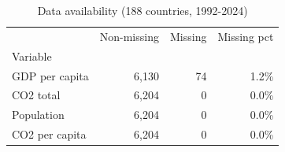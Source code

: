 \begin{table}[h]
\centering
\caption{Data availability (188 countries, 1992-2024)}
\begin{tabular}{lrrr}
\toprule
 & Non-missing & Missing & Missing pct \\
Variable &  &  &  \\
\midrule
GDP per capita & 6,130 & 74 & 1.2\% \\
CO2 total & 6,204 & 0 & 0.0\% \\
Population & 6,204 & 0 & 0.0\% \\
CO2 per capita & 6,204 & 0 & 0.0\% \\
\bottomrule
\end{tabular}
\end{table}

